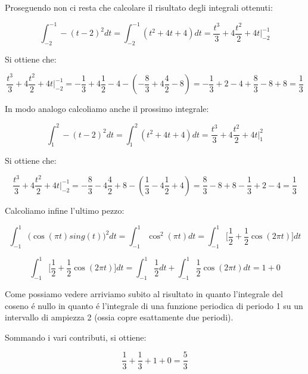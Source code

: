 \documentclass[../main.tex]{subfiles}
\begin{document}
Proseguendo non ci resta che calcolare il risultato degli integrali ottenuti:

\begin{equation}
	\int_{-2}^{-1} -(t -2)^2 dt = \int_{-2}^{-1} (t^2 + 4t + 4)dt = \frac{t^3}{3} + 4\frac{t^2}{2} + 4t \bigg|_{-2}^{-1}
\end{equation}

Si ottiene che:

\begin{equation}
	\frac{t^3}{3} + 4\frac{t^2}{2} + 4t \bigg|_{-2}^{-1} = -\frac{1}{3} + 4\frac{1}{2} -4 - \left( - \frac{8}{3} + 4 \frac{4}{2} - 8  \right) = -\frac{1}{3} +2 - 4 + \frac{8}{3} - 8 + 8 = \frac{1}{3}
\end{equation}

In modo analogo calcoliamo anche il prossimo integrale:


\begin{equation}
	\int_{1}^{2} -(t -2)^2 dt = \int_{1}^{2} (t^2 + 4t + 4)dt = \frac{t^3}{3} + 4\frac{t^2}{2} + 4t \bigg|_{1}^{2}
\end{equation}

Si ottiene che:

\begin{equation}
	\frac{t^3}{3} + 4\frac{t^2}{2} + 4t \bigg|_{-2}^{-1} = -\frac{8}{3} - 4\frac{4}{2} + 8 - \left( \frac{1}{3} - 4 \frac{1}{2} + 4  \right) = \frac{8}{3} -8 +8 - \frac{1}{3} + 2 -4 = \frac{1}{3}
\end{equation}

Calcoliamo infine l'ultimo pezzo:

\begin{equation}
	\int_{-1}^1 \big(\cos(\pi t)\unit{sing}(t)\big)^2 dt = \int_{-1}^1 \cos^2(\pi t) dt = \int_{-1}^1 \bigg[ \frac{1}{2} + \frac{1}{2} \cos(2\pi t) \bigg] dt 
\end{equation}

\begin{equation}
	\int_{-1}^1 \bigg[ \frac{1}{2} + \frac{1}{2} \cos(2\pi t) \bigg] dt = \int_{-1}^1 \frac{1}{2} dt + \int_{-1}^1 \frac{1}{2} \cos(2 \pi t) dt = 1 + 0
\end{equation}

Come possiamo vedere arriviamo subito al risultato in quanto l’integrale del coseno é nullo in quanto é l’integrale di una funzione periodica di periodo 1 su un intervallo di ampiezza 2 (ossia copre esattamente due periodi).

Sommando i vari contributi, si ottiene:

\begin{equation}
	\frac{1}{3} + \frac{1}{3} + 1 + 0 = \frac{5}{3}
\end{equation}
\end{document}
